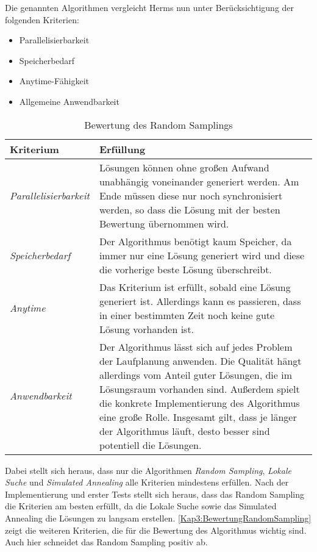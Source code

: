 Die genannten Algorithmen vergleicht Herms nun unter Berücksichtigung der folgenden Kriterien:
\begin{itemize}
  \item Parallelisierbarkeit
  \item Speicherbedarf
  \item Anytime-Fähigkeit
  \item Allgemeine Anwendbarkeit
\end{itemize}

\begin{table}[!t]
  \caption{Bewertung des Random Samplings}
  \label{Kap3:BewertungRandomSampling}
  \renewcommand{\arraystretch}{1.2}
  \centering
  \sffamily
  \begin{footnotesize}
    \begin{tabularx}{0.9\textwidth}{l X}
      \toprule
      \textbf{Kriterium} & \textbf{Erfüllung}\\
      \midrule
      \emph{Parallelisierbarkeit} & Lösungen können ohne großen Aufwand unabhängig voneinander generiert werden. Am Ende müssen diese nur noch synchronisiert werden, so dass die Lösung mit der besten Bewertung übernommen wird.\\
      \addlinespace
      \emph{Speicherbedarf} & Der Algorithmus benötigt kaum Speicher, da immer nur eine Lösung generiert wird und diese die vorherige beste Lösung überschreibt.\\
      \addlinespace
      \emph{Anytime} & Das Kriterium ist erfüllt, sobald eine Lösung generiert ist. Allerdings kann es passieren, dass in einer bestimmten Zeit noch keine gute Lösung vorhanden ist.\\
      \addlinespace
      \emph{Anwendbarkeit} & Der Algorithmus lässt sich auf jedes Problem der Laufplanung anwenden. Die Qualität hängt allerdings vom Anteil guter Lösungen, die im Lösungsraum vorhanden sind. Außerdem spielt die konkrete Implementierung des Algorithmus eine große Rolle. Insgesamt gilt, dass je länger der Algorithmus läuft, desto besser sind potentiell die Lösungen.\\
      \bottomrule
    \end{tabularx}
  \end{footnotesize}
  \rmfamily
\end{table}

Dabei stellt sich heraus, dass nur die Algorithmen \emph{Random Sampling}, \emph{Lokale Suche} und \emph{Simulated Annealing} alle Kriterien mindestens erfüllen. Nach der Implementierung und erster Tests stellt sich heraus, dass das Random Sampling die Kriterien am besten erfüllt, da die Lokale Suche sowie das Simulated Annealing die Lösungen zu langsam erstellen. \autoref{Kap3:BewertungRandomSampling} zeigt die weiteren Kriterien, die für die Bewertung des Algorithmus wichtig sind. Auch hier schneidet das Random Sampling positiv ab.

